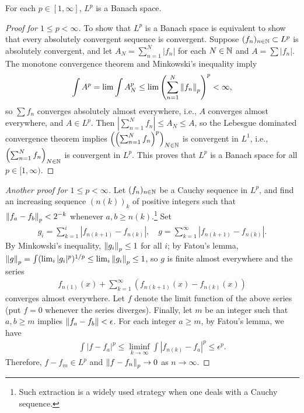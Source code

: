 \begin{thm}
    For each $p\in[1, \infty]$, $L^p$ is a Banach space.
\end{thm}
\begin{proof}[Proof for $1\leq p<\infty$]
    To show that $L^p$ is a Banach space is equivalent to show that every absolutely convergent sequence is convergent.
    Suppose $(f_n)_{n\in{\mathbb{N}}}\subset L^p$ is absolutely convergent, and let $A_N=\sum_{n=1}^N |f_n|$ for each $N\in{\mathbb{N}}$ and $A=\sum |f_n|$.
    The monotone convergence theorem and Minkowski's inequality imply
    \begin{align*}
        \int A^p=\lim\int A_N^p\leq\lim\left(\sum_{n=1}^N{\left\lVert{f_n}\right\rVert}_p\right)^p<\infty,
    \end{align*}
    so $\sum f_n$ converges absolutely almost everywhere, i.e., $A$ converges almost everywhere, and $A\in L^p$.
    Then $\left|\sum_{n=1}^N f_n\right|\leq A_N\leq A$, so the Lebesgue dominated convergence theorem implies $\left(\left(\sum_{n=1}^N f_n\right)^p\right)_{N\in{\mathbb{N}}}$ is convergent in $L^1$, i.e., $\left(\sum_{n=1}^N f_n\right)_{N\in{\mathbb{N}}}$ is convergent in $L^p$.
    This proves that $L^p$ is a Banach space for all $p\in[1, \infty)$.
\end{proof}
\begin{proof}[Another proof for $1\leq p<\infty$]
    Let $(f_n)_{n\in{\mathbb{N}}}$ be a Cauchy sequence in $L^p$, and find an increasing sequence $(n(k))_k$ of positive integers such that ${\left\lVert{f_a-f_b}\right\rVert}_p<2^{-k}$ whenever $a, b\geq n(k)$.\footnote{Such extraction is a widely used strategy when one deals with a Cauchy sequence.}
    Set
    \begin{align*}
        g_i=\sum_{k=1}^i|f_{n(k+1)}-f_{n(k)}|,\quad g=\sum_{k=1}^\infty|f_{n(k+1)}-f_{n(k)}|.
    \end{align*}
    By Minkowski's inequality, ${\left\lVert{g_i}\right\rVert}_p\leq 1$ for all $i$; by Fatou's lemma, ${\left\lVert{g}\right\rVert}_p=\int(\lim_i |g_i|^p)^{1/p}\leq\lim_i{\left\lVert{g_i}\right\rVert}_p\leq 1$, so $g$ is finite almost everywhere and the series
    \begin{align*}
        f_{n(1)}(x)+\sum_{k=1}^\infty (f_{n(k+1)}(x)-f_{n(k)}(x))
    \end{align*}
    converges almost everywhere.
    Let $f$ denote the limit function of the above series (put $f=0$ whenever the series diverges).
    Finally, let $m$ be an integer such that $a, b\geq m$ implies ${\left\lVert{f_a-f_b}\right\rVert}<\epsilon$.
    For each integer $a\geq m$, by Fatou's lemma, we have
    \begin{align*}
        \int |f-f_a|^p\leq\liminf_{k\rightarrow\infty}\int|f_{n(k)}-f_a|^p\leq\epsilon^p.
    \end{align*}
    Therefore, $f-f_m\in L^p$ and ${\left\lVert{f-f_n}\right\rVert}_p\rightarrow 0$ as $n\rightarrow\infty$.    
\end{proof}
